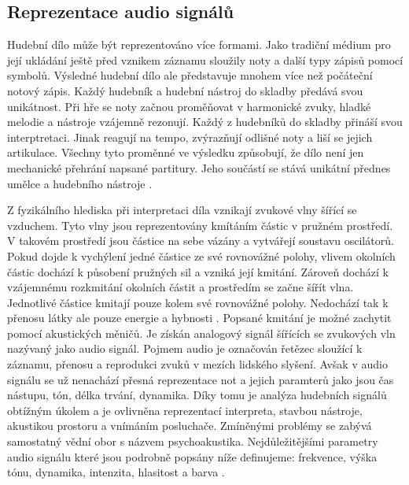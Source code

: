   \subsection{Reprezentace audio signálů} \label{sec:Audio}
  Hudební dílo může být reprezentováno více formami.
  Jako tradiční médium pro její ukládání ještě před vznikem záznamu sloužily noty a další typy zápisů pomocí symbolů.
  Výsledné hudební dílo ale představuje mnohem více než počáteční notový zápis.
  Každý hudebník a hudební nástroj do skladby předává svou unikátnost.
  Při hře se noty začnou proměňovat v harmonické zvuky, hladké melodie a nástroje vzájemně rezonují. 
  Každý z hudebníků do skladby přináší svou interptretaci. Jinak reagují na tempo, zvýrazňují odlišné noty a liší se jejich artikulace.
  Všechny tyto proměnné ve výsledku způsobují, že dílo není jen mechanické přehrání napsané partitury.
  Jeho součástí se stává unikátní přednes umělce a hudebního nástroje \cite{fundamental_of_music_processing}.

  Z fyzikálního hlediska při interpretaci díla vznikají zvukové vlny šířící se vzduchem.
  Tyto vlny jsou reprezentovány kmítáním částic v pružném prostředí. V takovém prostředí jsou částice na sebe vázány a vytvářejí soustavu oscilátorů. Pokud dojde k vychýlení jedné částice ze své rovnovážné polohy,
  vlivem okolních částic dochází k působení pružných sil a vzniká její kmitání. 
  Zároveň dochází k vzájemnému rozkmitání okolních částit a prostředím se začne šířít vlna. Jednotlivé částice kmitají pouze kolem své rovnovážné polohy. Nedochází tak k přenosu látky ale pouze energie a hybnosti \cite{crocker1998handbook}.
  Popsané kmitání je možné zachytit pomocí akustických měničů.
  Je získán analogový signál šířících se zvukových vln nazývaný jako audio signál.
  Pojmem audio je označován řetězec sloužící k záznamu, přenosu a reprodukci zvuků v mezích lidského slyšení.
  Avšak v audio signálu se už nenachází přesná reprezentace not a jejich paramterů jako jsou čas nástupu, tón, délka trvání, dynamika.
  Díky tomu je analýza hudebních signálů obtížným úkolem a je ovlivněna reprezentací interpreta, stavbou nástroje, akustikou prostoru a vnímáním posluchače.
  Zmíněnými problémy se zabývá samostatný vědní obor s názvem psychoakustika.
  Nejdůležitějšími parametry audio signálu které jsou podrobně popsány níže definujeme: frekvence, výška tónu, dynamika, intenzita, hlasitost a barva \cite{fundamental_of_music_processing}.

